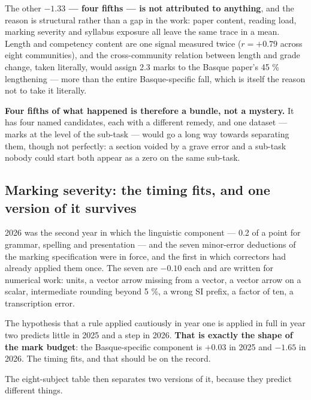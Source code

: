 \documentclass[
  10.5pt,
  a4paper,
  DIV=11,
  numbers=noendperiod]{scrartcl}
\begin{document}
The other \textbf{\(-1.33\) --- four fifths --- is not attributed to
anything}, and the reason is structural rather than a gap in the work:
paper content, reading load, marking severity and syllabus exposure all
leave the same trace in a mean. Length and competency content are one
signal measured twice (\(r = +0.79\) across eight communities), and the
cross-community relation between length and grade change, taken
literally, would assign 2.3 marks to the Basque paper's 45 \%
lengthening --- more than the entire Basque-specific fall, which is
itself the reason not to take it literally.

\textbf{Four fifths of what happened is therefore a bundle, not a
mystery.} It has four named candidates, each with a different remedy,
and one dataset --- marks at the level of the sub-task --- would go a
long way towards separating them, though not perfectly: a section voided
by a grave error and a sub-task nobody could start both appear as a zero
on the same sub-task.

\subsection{Marking severity: the timing fits, and one version of it
survives}\label{marking-severity-the-timing-fits-and-one-version-of-it-survives}

2026 was the second year in which the linguistic component --- 0.2 of a
point for grammar, spelling and presentation --- and the seven
minor-error deductions of the marking specification were in force, and
the first in which correctors had already applied them once. The seven
are \(-0.10\) each and are written for numerical work: units, a vector
arrow missing from a vector, a vector arrow on a scalar, intermediate
rounding beyond 5 \%, a wrong SI prefix, a factor of ten, a
transcription error.

The hypothesis that a rule applied cautiously in year one is applied in
full in year two predicts little in 2025 and a step in 2026.
\textbf{That is exactly the shape of the mark budget}: the
Basque-specific component is \(+0.03\) in 2025 and \(-1.65\) in 2026.
The timing fits, and that should be on the record.

The eight-subject table then separates two versions of it, because they
predict different things.
\end{document}
